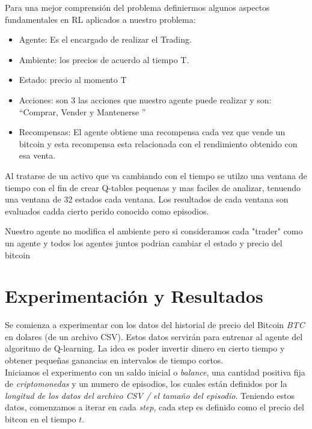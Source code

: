 \documentclass[12pt,letterpaper]{article}
\begin{document}
{Para una mejor comprensión del problema definiermos algunos aspectos fundamentales en RL aplicados a nuestro problema: 
\begin{itemize}
\item Agente: Es el encargado de realizar el Trading. 
\item Ambiente: los precios de acuerdo al tiempo T.
\item Estado: precio al momento T 
\item Acciones: son 3 las acciones que nuestro agente puede realizar y son: “Comprar, Vender y Mantenerse ”
\item Recompensas: El agente obtiene una recompensa cada vez que vende un bitcoin y esta recompensa esta relacionada con el rendimiento obtenido con esa venta. 
\end{itemize}

Al tratarse de un activo que va cambiando con el tiempo se utilzo una ventana de tiempo con el fin de crear Q-tables pequenas y mas faciles de analizar, tenuendo una ventana de 32 estados cada ventana. Los resultados de cada ventana son evaluados cadda cierto perido conocido como episodios.

Nuestro agente no modifica el ambiente pero si consideramos cada "trader" como un agente y todos los agentes juntos podrian cambiar el estado y precio del bitcoin 


\section{Experimentaci\'on y Resultados}
Se comienza a experimentar con los datos del historial de precio del Bitcoin \textit{BTC} en dolares (de un archivo CSV). Estos datos servirán para entrenar al agente del algoritmo de Q-learning. La idea es poder invertir dinero en cierto tiempo y obtener pequeñas ganancias en intervalos de tiempo cortos. \\

Iniciamos el experimento con un saldo inicial o \textit{balance}, una cantidad positiva fija de \textit{criptomonedas} y un numero de episodios, los cuales están definidos por la \textit{longitud de los datos del archivo CSV / el tamaño del episodio}. Teniendo estos datos, comenzamos a iterar en cada \textit{step}, cada step es definido como el precio del bitcon en el tiempo $t$.\\

}
\end{document}
